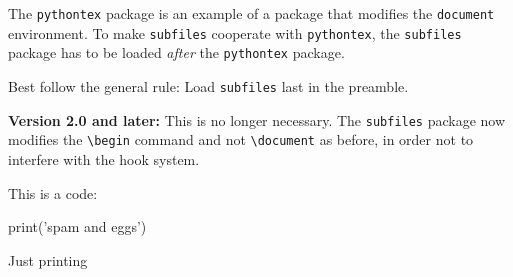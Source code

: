 \documentclass[main]{subfiles}
\begin{document}
The \verb|pythontex| package is an example of a package that modifies
the \verb|document| environment. To make \verb|subfiles| cooperate
with \verb|pythontex|, the \verb|subfiles| package has to be loaded
\emph{after} the \verb|pythontex| package.

Best follow the general rule: Load \verb|subfiles| last in the preamble.
\bigskip

\textbf{Version 2.0 and later:} This is no longer necessary. The \verb|subfiles| package now modifies the \verb|\begin| command and not \verb|\document| as before, in order not to interfere with the hook system.

\bigskip


This is a code:
\begin{pyverbatim}
print('spam and eggs')
\end{pyverbatim}

Just printing 
\end{document}
